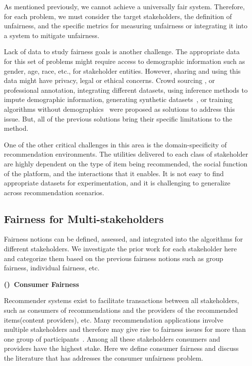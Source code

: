             As mentioned previously, we cannot achieve a universally fair system. Therefore, for each problem, we must consider the target stakeholders, the definition of unfairness, and the specific metrics for measuring unfairness or integrating it into a system to mitigate unfairness.

            Lack of data to study fairness goals is another challenge. The appropriate data for this set of problems might require access to demographic information such as gender, age, race, etc., for stakeholder entities. However, sharing and using this data might have privacy, legal or ethical concerns. Crowd sourcing \cite{biega2020overview}, or professional annotation, integrating different datasets, using inference methods to impute demographic information, generating synthetic datasets~\cite{burke2018synthetic}, or training algorithms without demographics~\cite{Kallus2020Assessing} were proposed as solutions to address this issue. But, all of the previous solutions bring their specific limitations to the method. 

            One of the other critical challenges in this area is the domain-specificity of recommendation environments. The utilities delivered to each class of stakeholder are highly dependent on the type of item being recommended, the social function of the platform, and the interactions that it enables. It is not easy to find appropriate datasets for experimentation, and it is challenging to generalize across recommendation scenarios.
        
    \subsection{Fairness for Multi-stakeholders}
    
        Fairness notions can be defined, assessed, and integrated into the algorithms for different stakeholders. We investigate the prior work for each stakeholder here and categorize them based on the previous fairness notions such as group fairness, individual fairness, etc.

        \textbf{()~Consumer Fairness}
        
            Recommender systems exist to facilitate transactions between all stakeholders, such as consumers of recommendations and the providers of the recommended items(content providers), etc. Many recommendation applications involve multiple stakeholders and therefore may give rise to fairness issues for more than one group of participants~\cite{burke_multisided_2017}. Among all these stakeholders consumers and providers have the highest stake. Here we  define consumer fairness and discuss the literature that has addresses the consumer unfairness problem.
        

